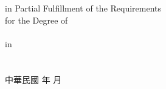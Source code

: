 \begin{center}
\relax %
\else
\collEname\\%
\fi
%
\univEname\\%
%
in Partial Fulfillment of the Requirements\\
%
for the Degree of\\
%
\degreeEname\\%
%
in\\
%
\deptEname\\%
%
\eMonth\ \eYear\\%
%
\ePlace%
\vfill
中華民國%
\cYear%
年%
\cMonth%
月\\
\end{center}
\normalsize
\clearpage
%
\newpage%
{\thispagestyle{empty}%
%
\mbox{}\clearpage}

%
\newpage%
{\thispagestyle{empty}%
%
\mbox{}\clearpage}

%
\newpage
\thispagestyle{plain}  %


